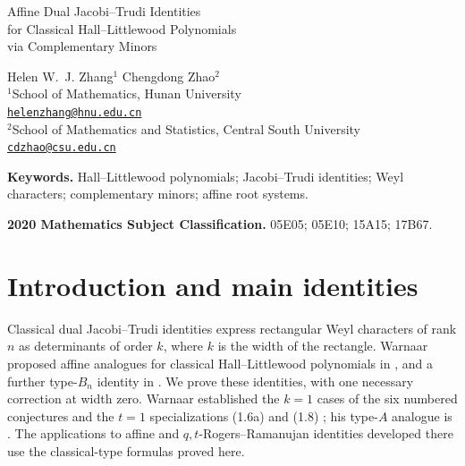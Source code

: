 \documentclass[12pt]{article}
\numberwithin{equation}{section}
\begin{document}
\begin{center}
\LARGE
Affine Dual Jacobi--Trudi Identities\\[3pt]
for Classical Hall--Littlewood Polynomials\\[3pt]
via Complementary Minors
\end{center}
\begin{center}
\large Helen W.~J. Zhang$^{1}$ \qquad Chengdong Zhao$^{2}$\\[6pt]
\small
$^{1}$School of Mathematics, Hunan University\\
\href{mailto:helenzhang@hnu.edu.cn}{\texttt{helenzhang@hnu.edu.cn}}\\[5pt]
$^{2}$School of Mathematics and Statistics, Central South University\\
\href{mailto:cdzhao@csu.edu.cn}{\texttt{cdzhao@csu.edu.cn}}
\end{center}
\medskip

\begin{abstract}
We prove the six affine dual Jacobi--Trudi identities conjectured by
Warnaar for rectangular Hall--Littlewood polynomials of types $B_n$,
$C_n$, and $BC_n$, together with his additional type-$B_n$ identity at
$s=t$. We give a uniform proof by adapting the complementary-minor
method used by Aitken for symmetric-function duality.
\end{abstract}

\medskip
\noindent\textbf{Keywords.} Hall--Littlewood polynomials; Jacobi--Trudi
identities; Weyl characters; complementary minors; affine root systems.

\smallskip
\noindent\textbf{2020 Mathematics Subject Classification.}
05E05; 05E10; 15A15; 17B67.

\section{Introduction and main identities}

Classical dual Jacobi--Trudi identities express rectangular Weyl
characters of rank $n$ as determinants of order $k$, where $k$ is the
width of the rectangle.  Warnaar proposed affine analogues for classical
Hall--Littlewood polynomials in \cite[Conjectures~1.2--1.4]{Warnaar2026},
and a further type-$B_n$ identity in \cite[Section~6]{Warnaar2026}.
We prove these identities, with one necessary correction at width zero.
Warnaar established the $k=1$ cases of the six numbered conjectures and
the $t=1$ specializations (1.6a) and (1.8)
\cite[Lemmas~4.1--4.4]{Warnaar2026}; his type-$A$ analogue is
\cite[Theorem~1.1]{Warnaar2026}.  The applications to affine and
$q,t$-Rogers--Ramanujan identities developed there use the classical-type
formulas proved here.
\end{document}
